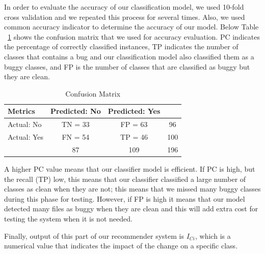 	
	In order to evaluate the accuracy of our classification model, we used 
	10-fold cross validation and we repeated this process for several times. 
	Also, we used common accuracy indicator to determine the accuracy of 
	our model. Below Table ~\ref{tab:ConfusionMatrix} shows the confusion matrix that we used
	for accuracy evaluation. PC indicates the percentage of correctly classified 
	instances, TP indicates the number of classes that contains a bug and our classification
	model also classified them as a buggy classes, and FP is the number of classes that 
	are classified as buggy but they are clean. 
	
	
	\begin{table}[!ht]
		\caption{Confusion Matrix}
		\vspace*{-10pt}
		\begin{center}
			\begin{tabular}{|l||c||c||c|}
				\hline
				Metrics     & Predicted: No & Predicted: Yes &  \\ \hline
				Actual: No  &     TN = 33   &     FP =  63   & 96 \\ \hline
				Actual: Yes &     FN = 54   &     TP =  46   & 100 \\ \hline
				            &      87       &       109      & 196 \\ \hline
			\end{tabular}
			\end {center}
			\label{tab:ConfusionMatrix}
			\vspace*{-5pt}
	\end{table}
	
	A higher PC value means that our classifier model is efficient. 
	If PC is high, but the recall (TP) low, this means that our classifier classified a large number of
	classes as clean when they are not; this means that we missed many buggy classes during this phase
	for testing. However, if FP is high it means that our model detected many files as buggy when they 
	are clean and this will add extra cost for testing the system when it is not needed. 
	
	Finally, output of this part of our recommender system is $I_{Ci}$, which is a
	numerical value that indicates the impact of the change on a specific class.  
	
	
	
	
	
	
